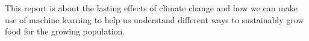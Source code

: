 This report is about the lasting effects of climate change and how we can make use of machine learning to help us understand different ways to sustainably grow food for the growing population.

